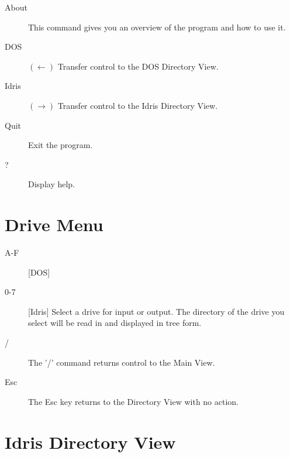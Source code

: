 \begin{description}
\item[About] \nl
            This command gives you an overview of the program and
            how to use it.
\item[DOS] $(\leftarrow)$ \nl
            Transfer control to the DOS Directory View.
\item[Idris] $(\rightarrow)$ \nl
            Transfer control to the Idris Directory View.
\item[Quit] \nl
            Exit the program.
\item[?] \nl
            Display help.
\end{description}

 
\section{Drive Menu}

\begin{description}
\item[A-F] [DOS]
\item[0-7] [Idris]\nl
        Select a drive for input or output.  The directory of the
        drive you select will be read in and displayed in tree form.
\item[/ ] \nl
            The '/' command returns control to the Main View.
\item[Esc] \nl
            The Esc key returns to the Directory View with no action.

\end{description}


\section{Idris Directory View}

